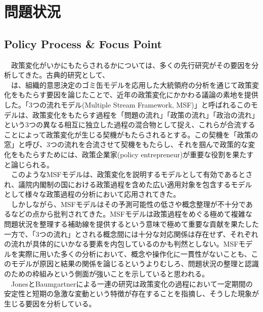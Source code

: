 \section{問題状況}
\subsection{Policy Process \& Focus Point}
　政策変化がいかにもたらされるかについては、多くの先行研究がその要因を分析してきた。古典的研究として、\\
　\citet*{Kingdon1984-oq, Kingdon2013-ac}は、組織的意思決定のゴミ缶モデル\citep*{Cohen1972-ym}を応用した大統領府の分析を通じて政策変化をもたらす要因を論じたことで、近年の政策変化にかかわる議論の素地を提供した。「3つの流れモデル(Multiple Stream Framework, MSF)」と呼ばれるこのモデルは、政策変化をもたらす過程を「問題の流れ」「政策の流れ」「政治の流れ」という3つの異なる相互に独立した過程の混合物として捉え、これらが合流することによって政策変化が生じる契機がもたらされるとする。この契機を「政策の窓」と呼び、3つの流れを合流させて契機をもたらし、それを掴んで政策的な変化をもたらすためには、政策企業家(policy entrepreneur)が重要な役割を果たすと論じられる。\citep*{Kingdon1984-oq, Kingdon2013-ac}\\
　このようなMSFモデルは、政策変化を説明するモデルとして有効であるとされ、議院内閣制の国における政策過程を含めた広い適用対象を包含するモデルとして様々な政策過程の分析において応用されてきた。\citep*{Rawat2016-ew,Jones2016-lc}\\
　しかしながら、MSFモデルはその予測可能性の低さ\citep*{}や概念整理が不十分である\citep*{John2018-im}などの点から批判されてきた。MSFモデルは政策過程をめぐる極めて複雑な問題状況を整理する補助線を提供するという意味で極めて重要な貢献を果たした一方で、「3つの流れ」とされる概念間には十分な対応関係は存在せず、それぞれの流れが具体的にいかなる要素を内包しているのかも判然としない。MSFモデルを実際に用いた多くの分析において、概念や操作化に一貫性がない\citep*{Jones2016-lc}ことも、このモデルが原因と結果の関係を論じるというよりむしろ、問題状況の整理と認識のための枠組みという側面が強いことを示していると思われる。\\
　JonesとBaumgartnerによる一連の研究\citep*{Baumgartner2010-rl, Baumgartner2020-ee, Baumgartner2009-eb}は政策変化の過程において一定期間の安定性と短期の急激な変動という特徴が存在することを指摘し、そうした現象が生じる要因を分析している。\\

